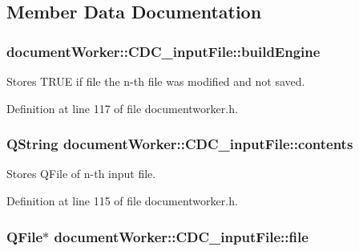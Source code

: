 \subsection{Member Data Documentation}
\hypertarget{structdocument_worker_1_1_c_d_c__input_file_a31bc229e003dfd135332eb1d57d982f0}{
\subsubsection[{build\+Engine}]{ document\+Worker\+::\+C\+D\+C\+\_\+input\+File\+::build\+Engine}}\label{structdocument_worker_1_1_c_d_c__input_file_a31bc229e003dfd135332eb1d57d982f0}


Stores T\+R\+U\+E if file the n-\/th file was modified and not saved. 



Definition at line 117 of file documentworker.\+h.

\hypertarget{structdocument_worker_1_1_c_d_c__input_file_af38edb5a0dfeda3255dd655e736001e0}{
\subsubsection[{contents}]{\setlength{\rightskip}{0pt plus 5cm}Q\+String document\+Worker\+::\+C\+D\+C\+\_\+input\+File\+::contents}}\label{structdocument_worker_1_1_c_d_c__input_file_af38edb5a0dfeda3255dd655e736001e0}


Stores Q\+File of n-\/th input file. 



Definition at line 115 of file documentworker.\+h.

\hypertarget{structdocument_worker_1_1_c_d_c__input_file_a807c1fdfcb9e3d0d1112e7fa940505b8}{
\subsubsection[{file}]{\setlength{\rightskip}{0pt plus 5cm}Q\+File$\ast$ document\+Worker\+::\+C\+D\+C\+\_\+input\+File\+::file}}\label{structdocument_worker_1_1_c_d_c__input_file_a807c1fdfcb9e3d0d1112e7fa940505b8}


